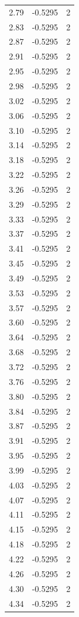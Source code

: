 \begin{longtable}{lrr}
  2.79 & -0.5295 & 2 \\
  2.83 & -0.5295 & 2 \\
  2.87 & -0.5295 & 2 \\
  2.91 & -0.5295 & 2 \\
  2.95 & -0.5295 & 2 \\
  2.98 & -0.5295 & 2 \\
  3.02 & -0.5295 & 2 \\
  3.06 & -0.5295 & 2 \\
  3.10 & -0.5295 & 2 \\
  3.14 & -0.5295 & 2 \\
  3.18 & -0.5295 & 2 \\
  3.22 & -0.5295 & 2 \\
  3.26 & -0.5295 & 2 \\
  3.29 & -0.5295 & 2 \\
  3.33 & -0.5295 & 2 \\
  3.37 & -0.5295 & 2 \\
  3.41 & -0.5295 & 2 \\
  3.45 & -0.5295 & 2 \\
  3.49 & -0.5295 & 2 \\
  3.53 & -0.5295 & 2 \\
  3.57 & -0.5295 & 2 \\
  3.60 & -0.5295 & 2 \\
  3.64 & -0.5295 & 2 \\
  3.68 & -0.5295 & 2 \\
  3.72 & -0.5295 & 2 \\
  3.76 & -0.5295 & 2 \\
  3.80 & -0.5295 & 2 \\
  3.84 & -0.5295 & 2 \\
  3.87 & -0.5295 & 2 \\
  3.91 & -0.5295 & 2 \\
  3.95 & -0.5295 & 2 \\
  3.99 & -0.5295 & 2 \\
  4.03 & -0.5295 & 2 \\
  4.07 & -0.5295 & 2 \\
  4.11 & -0.5295 & 2 \\
  4.15 & -0.5295 & 2 \\
  4.18 & -0.5295 & 2 \\
  4.22 & -0.5295 & 2 \\
  4.26 & -0.5295 & 2 \\
  4.30 & -0.5295 & 2 \\
  4.34 & -0.5295 & 2 \\

\end{longtable}
